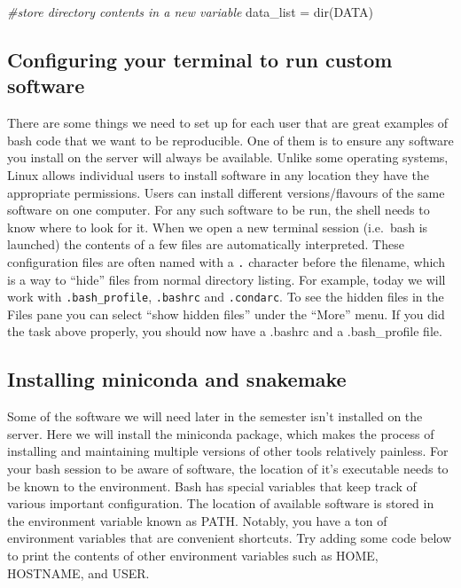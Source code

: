 \documentclass[
]{article}
\newenvironment{Shaded}{\begin{snugshade}}{\end{snugshade}}
\newcommand{\CommentTok}[1]{\textcolor[rgb]{0.56,0.35,0.01}{\textit{#1}}}
\newcommand{\FunctionTok}[1]{\textcolor[rgb]{0.00,0.00,0.00}{#1}}
\newcommand{\NormalTok}[1]{#1}
\newcommand{\OtherTok}[1]{\textcolor[rgb]{0.56,0.35,0.01}{#1}}
\begin{document}
\begin{Shaded}
\begin{Highlighting}[]
\CommentTok{\#store directory contents in a new variable}
\NormalTok{data\_list }\OtherTok{=} \FunctionTok{dir}\NormalTok{(DATA)}
\end{Highlighting}
\end{Shaded}

\hypertarget{configuring-your-terminal-to-run-custom-software}{%
\subsection{Configuring your terminal to run custom
software}\label{configuring-your-terminal-to-run-custom-software}}

There are some things we need to set up for each user that are great
examples of bash code that we want to be reproducible. One of them is to
ensure any software you install on the server will always be available.
Unlike some operating systems, Linux allows individual users to install
software in any location they have the appropriate permissions. Users
can install different versions/flavours of the same software on one
computer. For any such software to be run, the shell needs to know where
to look for it. When we open a new terminal session (i.e.~bash is
launched) the contents of a few files are automatically interpreted.
These configuration files are often named with a \texttt{.} character
before the filename, which is a way to ``hide'' files from normal
directory listing. For example, today we will work with
\texttt{.bash\_profile}, \texttt{.bashrc} and \texttt{.condarc}. To see
the hidden files in the Files pane you can select ``show hidden files''
under the ``More'' menu. If you did the task above properly, you should
now have a .bashrc and a .bash\_profile file.

\hypertarget{installing-miniconda-and-snakemake}{%
\subsection{Installing miniconda and
snakemake}\label{installing-miniconda-and-snakemake}}

Some of the software we will need later in the semester isn't installed
on the server. Here we will install the miniconda package, which makes
the process of installing and maintaining multiple versions of other
tools relatively painless. For your bash session to be aware of
software, the location of it's executable needs to be known to the
environment. Bash has special variables that keep track of various
important configuration. The location of available software is stored in
the environment variable known as PATH. Notably, you have a ton of
environment variables that are convenient shortcuts. Try adding some
code below to print the contents of other environment variables such as
HOME, HOSTNAME, and USER.
\end{document}
